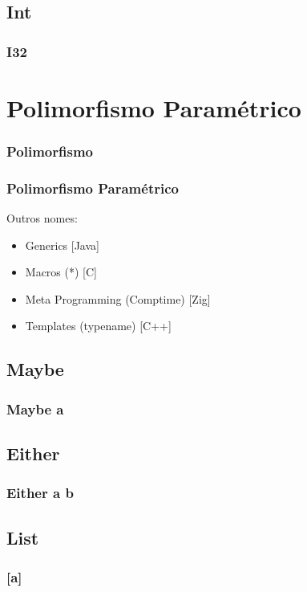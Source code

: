 \documentclass{beamer}
\begin{document}
\subsection{Int}
\begin{frame}
    \frametitle{I32}
\end{frame}

\section{Polimorfismo Paramétrico}
\begin{frame}
    \frametitle{Polimorfismo}
\end{frame}

\begin{frame}
    \frametitle{Polimorfismo Paramétrico}
    Outros nomes:
    \begin{itemize}
        \item Generics [Java]
        \item Macros (*) [C]
        \item Meta Programming (Comptime) [Zig]
        \item Templates (typename) [C++]
    \end{itemize}
\end{frame}

\subsection{Maybe}
\begin{frame}
    \frametitle{Maybe a}
\end{frame}

\subsection{Either}
\begin{frame}
    \frametitle{Either a b}
\end{frame}

\subsection{List}
\begin{frame}
    \frametitle{[a]}
\end{frame}
\end{document}
